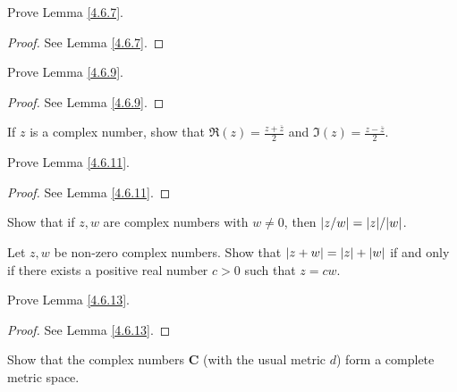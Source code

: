 \begin{exercise}\label{ex 4.6.3}
    Prove Lemma \ref{4.6.7}.
\end{exercise}

\begin{proof}
    See Lemma \ref{4.6.7}.
\end{proof}

\begin{exercise}\label{ex 4.6.4}
    Prove Lemma \ref{4.6.9}.
\end{exercise}

\begin{proof}
    See Lemma \ref{4.6.9}.
\end{proof}

\begin{exercise}\label{ex 4.6.5}
    If \(z\) is a complex number, show that \(\Re(z) = \frac{z + \overline{z}}{2}\) and \(\Im(z) = \frac{z - \overline{z}}{2}\).
\end{exercise}

\begin{exercise}\label{ex 4.6.6}
    Prove Lemma \ref{4.6.11}.
\end{exercise}

\begin{proof}
    See Lemma \ref{4.6.11}.
\end{proof}

\begin{exercise}\label{ex 4.6.7}
    Show that if \(z, w\) are complex numbers with \(w \neq 0\), then \(\abs*{z / w} = \abs*{z} / \abs*{w}\).
\end{exercise}

\begin{exercise}\label{ex 4.6.8}
    Let \(z, w\) be non-zero complex numbers.
    Show that \(\abs*{z + w} = \abs*{z} + \abs*{w}\) if and only if there exists a positive real number \(c > 0\) such that \(z = cw\).
\end{exercise}

\begin{exercise}\label{ex 4.6.9}
    Prove Lemma \ref{4.6.13}.
\end{exercise}

\begin{proof}
    See Lemma \ref{4.6.13}.
\end{proof}

\begin{exercise}\label{ex 4.6.10}
    Show that the complex numbers \(\mathbf{C}\) (with the usual metric \(d\)) form a complete metric space.
\end{exercise}

